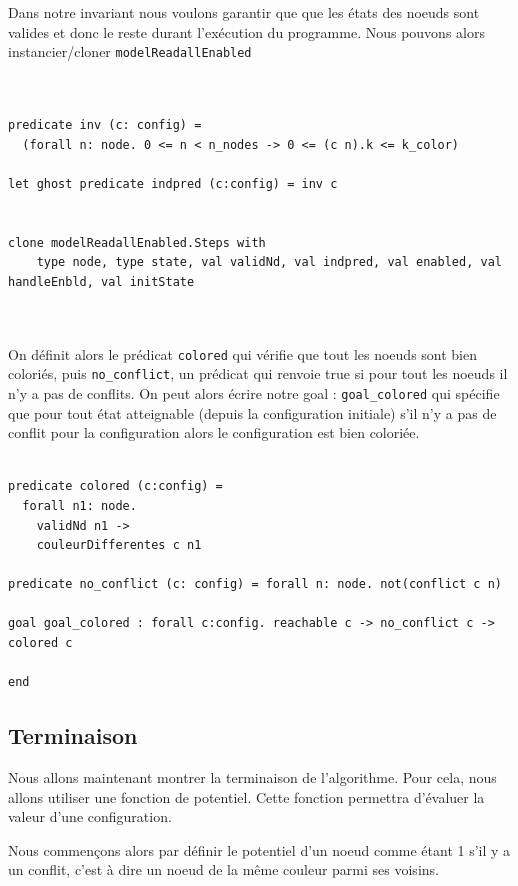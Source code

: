 \documentclass[11pt]{article}
\begin{document}
Dans notre invariant nous voulons garantir que que les états des noeuds sont valides et donc le reste durant l'exécution du programme.
Nous pouvons alors instancier/cloner \texttt{modelReadallEnabled}

\lstset{language=why3,label= ,caption= ,captionpos=b,numbers=none}
\begin{lstlisting}


predicate inv (c: config) =
  (forall n: node. 0 <= n < n_nodes -> 0 <= (c n).k <= k_color)

let ghost predicate indpred (c:config) = inv c


clone modelReadallEnabled.Steps with
    type node, type state, val validNd, val indpred, val enabled, val handleEnbld, val initState



\end{lstlisting}

On définit alors le prédicat \texttt{colored} qui vérifie que tout les noeuds sont bien coloriés, 
puis \texttt{no\_conflict}, un prédicat qui renvoie true si pour tout les noeuds il n'y a pas de conflits.
On peut alors écrire notre goal : \texttt{goal\_colored} qui spécifie que pour tout état atteignable (depuis 
la configuration initiale) s'il n'y a pas de conflit pour la configuration alors le configuration 
est bien coloriée. 

\lstset{language=why3,label= ,caption= ,captionpos=b,numbers=none}
\begin{lstlisting}

predicate colored (c:config) =
  forall n1: node.
    validNd n1 ->
    couleurDifferentes c n1

predicate no_conflict (c: config) = forall n: node. not(conflict c n)

goal goal_colored : forall c:config. reachable c -> no_conflict c -> colored c

end

\end{lstlisting}

\subsection{Terminaison}
\label{sec:org637ad0f}

Nous allons maintenant montrer la terminaison de l'algorithme. 
Pour cela, nous allons utiliser une fonction de potentiel. 
Cette fonction permettra d'évaluer la valeur d'une configuration.


Nous commençons alors par définir le potentiel d'un noeud comme étant 1 s'il y a un conflit, 
c'est à dire un noeud de la même couleur parmi ses voisins. 
\end{document}

